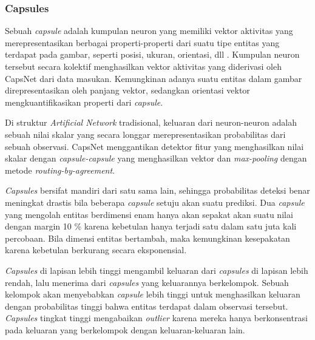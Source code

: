 \documentclass{article}
\begin{document}
	   	\subsubsection{Capsules}
	   	Sebuah \textit{capsule} adalah kumpulan neuron yang memiliki vektor aktivitas yang merepresentasikan berbagai properti-properti dari suatu tipe entitas yang terdapat pada gambar, seperti posisi, ukuran, orientasi, dll \cite{hinton}. Kumpulan neuron tersebut secara kolektif menghasilkan vektor aktivitas yang diderivasi oleh CapsNet dari data masukan. Kemungkinan adanya suatu entitas dalam gambar direpresentasikan oleh panjang vektor, sedangkan orientasi vektor mengkuantifikasikan properti dari \textit{capsule}. 
	   	\par
	   	Di struktur \textit{Artificial Network} tradisional, keluaran dari neuron-neuron adalah sebuah nilai skalar yang secara longgar merepresentasikan probabilitas dari sebuah observasi. CapsNet menggantikan detektor fitur yang menghasilkan nilai skalar dengan \textit{capsule-capsule} yang menghasilkan vektor dan \textit{max-pooling} dengan metode \textit{routing-by-agreement}. 
	   	\par
	   	\textit{Capsules} bersifat mandiri dari satu sama lain, sehingga probabilitas deteksi benar meningkat drastis bila beberapa \textit{capsule} setuju akan suatu prediksi. Dua \textit{capsule} yang mengolah entitas berdimensi enam hanya akan sepakat akan suatu nilai dengan margin 10 \% karena kebetulan hanya terjadi satu dalam satu juta kali percobaan. Bila dimensi entitas bertambah, maka kemungkinan kesepakatan karena kebetulan berkurang secara eksponensial. 
	   	\par
	   	\textit{Capsules} di lapisan lebih tinggi mengambil keluaran dari \textit{capsules} di lapisan lebih rendah, lalu menerima dari \textit{capsules} yang keluarannya berkelompok. Sebuah kelompok akan menyebabkan \textit{capsule} lebih tinggi untuk menghasilkan keluaran dengan probabilitas tinggi bahwa entitas terdapat dalam observasi tersebut. \textit{Capsules} tingkat tinggi mengabaikan \textit{outlier} karena mereka hanya berkonsentrasi pada keluaran yang berkelompok dengan keluaran-keluaran lain.
	   	
\end{document}
